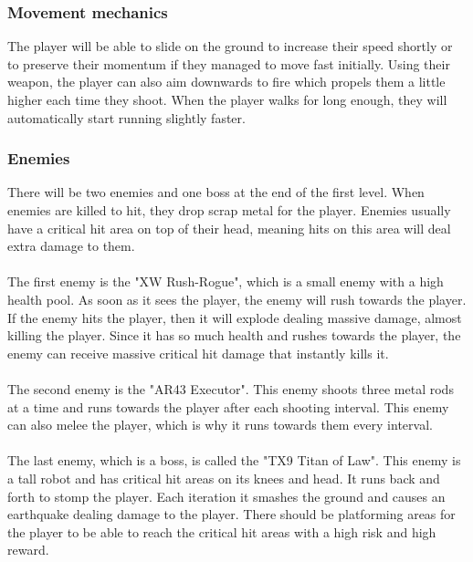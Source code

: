 \documentclass[../Main.tex]{subfiles}
\begin{document}
\subsubsection{Movement mechanics}

The player will be able to slide on the ground to increase their speed shortly or to preserve their momentum if they managed to move fast initially. Using their weapon, the player can also aim downwards to fire which propels them a little higher each time they shoot. When the player walks for long enough, they will automatically start running slightly faster.

\subsubsection{Enemies}

 There will be two enemies and one boss at the end of the first level. When enemies are killed to hit, they drop scrap metal for the player. Enemies usually have a critical hit area on top of their head, meaning hits on this area will deal extra damage to them. 

\paragraph{}
The first enemy is the "XW Rush-Rogue", which is a small enemy with a high health pool. As soon as it sees the player, the enemy will rush towards the player. If the enemy hits the player, then it will explode dealing massive damage, almost killing the player. Since it has so much health and rushes towards the player, the enemy can receive massive critical hit damage that instantly kills it.

\paragraph{}
The second enemy is the "AR43 Executor". This enemy shoots three metal rods at a time and runs towards the player after each shooting interval. This enemy can also melee the player, which is why it runs towards them every interval.

\paragraph{}
The last enemy, which is a boss, is called the "TX9 Titan of Law". This enemy is a tall robot and has critical hit areas on its knees and head. It runs back and forth to stomp the player. Each iteration it smashes the ground and causes an earthquake dealing damage to the player. There should be platforming areas for the player to be able to reach the critical hit areas with a high risk and high reward. 
\end{document}

